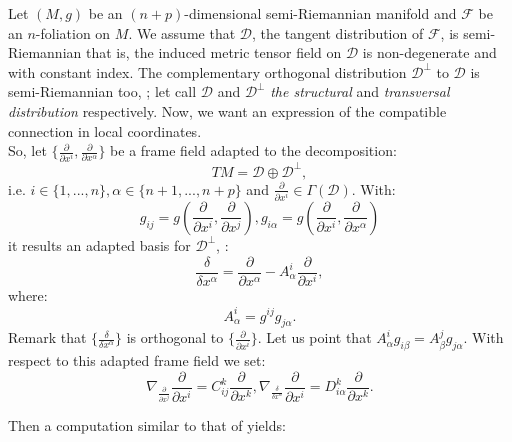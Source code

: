 \documentclass[11pt,oneside,english]{amsart}
\numberwithin{equation}{section}
\numberwithin{figure}{section}
\theoremstyle{plain}
\theoremstyle{definition}
\theoremstyle{definition}
\theoremstyle{plain}
\theoremstyle{plain}
\theoremstyle{remark}
\theoremstyle{remark}
\begin{document}
Let $(M,g)$ be an $(n+p)$-dimensional semi-Riemannian manifold and
$\mathcal{F}$ be an $n$-foliation on $M$. We assume that $\mathcal{D}$,
the tangent distribution of $\mathcal{F}$, is semi-Riemannian that
is, the induced metric tensor field on $\mathcal{D}$ is non-degenerate
and with constant index. The complementary orthogonal distribution
$\mathcal{D}^{\bot}$ to $\mathcal{D}$ is semi-Riemannian too, \cite[p. 95]{b:f};
let call $\mathcal{D}$ and $\mathcal{D}^{\bot}$ \textit{the structural}
and \textit{transversal distribution} respectively. Now, we want an
expression of the compatible connection in local coordinates.\\
So, let $\{\frac{\partial}{\partial x^{i}},\frac{\partial}{\partial x^{\alpha}}\}$
be a frame field adapted to the decomposition: \begin{equation}
TM=\mathcal{D}\oplus\mathcal{D}^{\bot},\label{eq:11}\end{equation}
 i.e. $i\in\{1,...,n\},\alpha\in\{n+1,...,n+p\}$ and $\frac{\partial}{\partial x^{i}}\in\Gamma(\mathcal{D}).$
With: \begin{equation}
g_{ij}=g\left(\frac{\partial}{\partial x^{i}},\frac{\partial}{\partial x^{j}}\right),g_{i\alpha}=g\left(\frac{\partial}{\partial x^{i}},\frac{\partial}{\partial x^{\alpha}}\right)\label{eq:12}\end{equation}
 it results an adapted basis for $\mathcal{D}^{\bot}$, \cite[p. 98]{b:f}:
\begin{equation}
\frac{\delta}{\delta x^{\alpha}}=\frac{\partial}{\partial x^{\alpha}}-A_{\alpha}^{i}\frac{\partial}{\partial x^{i}},\label{eq:13}\end{equation}
 where: \begin{equation}
A_{\alpha}^{i}=g^{ij}g_{j\alpha}.\label{eq:14}\end{equation}
 Remark that $\{\frac{\delta}{\delta x^{\alpha}}\}$ is orthogonal
to $\{\frac{\partial}{\partial x^{i}}\}.$ Let us point that $A_{\alpha}^{i}g_{i\beta}=A_{\beta}^{j}g_{j\alpha}.$
With respect to this adapted frame field we set: \begin{equation}
\nabla_{\frac{\partial}{\partial x^{j}}}\frac{\partial}{\partial x^{i}}=C_{ij}^{k}\frac{\partial}{\partial x^{k}},\nabla_{\frac{\delta}{\delta x^{\alpha}}}\frac{\partial}{\partial x^{i}}=D_{i\alpha}^{k}\frac{\partial}{\partial x^{k}}.\label{eq:15}\end{equation}

Then a computation similar to that of \cite[p. 99-100]{b:f} yields:
\end{document}
